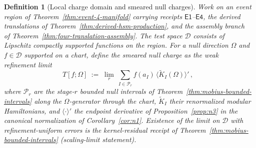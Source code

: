 \documentclass[11pt]{article}
\newtheorem{definition}[theorem]{Definition}
\begin{document}
\begin{definition}[Local charge domain and smeared null charges]
\label{def:local-charge-domain}
Work on an event region of Theorem~\ref{thm:event-4-manifold} carrying
receipts \(\mathsf{E1}\)--\(\mathsf{E4}\), the derived translations of
Theorem~\ref{thm:derived-hsm-production}, and the assembly branch of
Theorem~\ref{thm:four-translation-assembly}. The test space
\(\mathcal D\) consists of Lipschitz compactly supported functions on the
region. For a null direction \(\Omega\) and \(f\in\mathcal D\) supported on a
chart, define the smeared null charge as the weak refinement limit
\[
T[f;\Omega]\;:=\;\lim_r\ \sum_{I\in\mathcal P_r}
f(a_I)\,\bigl\langle \widetilde K_{I}(\Omega)\bigr\rangle'\, ,
\]
where \(\mathcal P_r\) are the stage-\(r\) bounded null intervals of
Theorem~\ref{thm:mobius-bounded-intervals} along the \(\Omega\)-generator
through the chart, \(\widetilde K_I\) their renormalized modular
Hamiltonians, and \(\langle\cdot\rangle'\) the endpoint derivative of
Proposition~\ref{prop:n3} in the canonical normalization of
Corollary~\ref{cor:n1}. Existence of the limit on \(\mathcal D\) with
refinement-uniform errors is the kernel-residual receipt of
Theorem~\ref{thm:mobius-bounded-intervals} (scaling-limit statement).
\end{definition}
\end{document}
